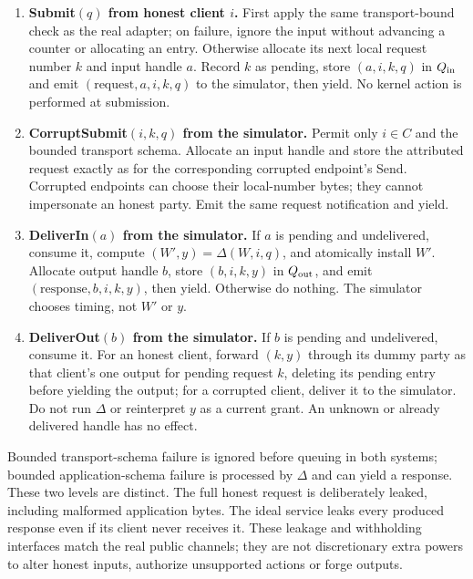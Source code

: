 \begin{enumerate}
\item \textbf{Submit$(q)$ from honest client $i$.}
First apply the same transport-bound check as the real adapter; on failure,
ignore the input without advancing a counter or allocating an entry.
Otherwise allocate its next local request number $k$ and input handle $a$.
Record $k$ as pending, store $(a,i,k,q)$ in $Q_{\rm in}$ and emit
$(\mathrm{request},a,i,k,q)$ to the simulator, then yield.
No kernel action is performed at submission.
\item \textbf{CorruptSubmit$(i,k,q)$ from the simulator.}
Permit only $i\in C$ and the bounded transport schema.
Allocate an input handle and store the attributed request exactly as for
the corresponding corrupted endpoint's Send. Corrupted endpoints can
choose their local-number bytes; they cannot impersonate an honest party.
Emit the same request notification and yield.
\item \textbf{DeliverIn$(a)$ from the simulator.}
If $a$ is pending and undelivered, consume it, compute
$(W',y)=\Delta(W,i,q)$, and atomically install $W'$.
Allocate output handle $b$, store $(b,i,k,y)$ in $Q_{\rm out}$,
and emit $(\mathrm{response},b,i,k,y)$, then yield.
Otherwise do nothing. The simulator chooses timing, not $W'$ or $y$.
\item \textbf{DeliverOut$(b)$ from the simulator.}
If $b$ is pending and undelivered, consume it. For an honest client,
forward $(k,y)$ through its dummy party as that client's one output
for pending request $k$, deleting its pending entry before yielding
the output; for a corrupted client, deliver it to the
simulator. Do not run $\Delta$ or reinterpret $y$ as a current grant.
An unknown or already delivered handle has no effect.
\end{enumerate}

Bounded transport-schema failure is ignored before queuing in both
systems; bounded application-schema failure is processed by $\Delta$
and can yield a response. These two levels are distinct.
The full honest request is deliberately leaked, including malformed
application bytes. The ideal service leaks every produced response even
if its client never receives it. These leakage and withholding interfaces
match the real public channels; they are not discretionary extra powers
to alter honest inputs, authorize unsupported actions or forge outputs.

